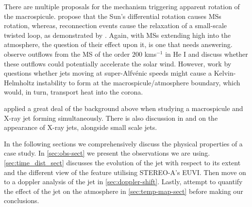 There are multiple proposals for the mechanism triggering apparent rotation of the macrospicule. 
\cite{Curdt2011} propose that the Sun's differential rotation causes MSs rotation, whereas, reconnection events cause the relaxation of a small-scale twisted loop, as demonstrated by \cite{Adams2014}.
Again, with MSs extending high into the atmosphere, the question of their effect upon it, is one that needs answering.
\cite{Pike1997} observe outflows from the MS of the order $200$ kms$^{-1}$ in He I and discuss whether these outflows could potentially accelerate the solar wind.
However, work by \cite{Zaqarashvili2014} questions whether jets moving at super-Alfv{\'e}nic speeds might cause a Kelvin-Helmholtz instability to form at the macrospicule/atmosphere boundary, which would, in turn, transport heat into the corona.

\cite{Kamio2010} applied a great deal of the background above when studying a macrospicule and X-ray jet forming simultaneously. 
There is also discussion in \cite{Pike1997} and \cite{Kim2007} on the appearance of X-ray jets, alongside small scale jets.

In the following sections we comprehensively discuss the physical properties of a case study. In \cref{sec:obs-sect} we present the observations we are using. 
\ref{sec:time_dist_sect} discusses the evolution of the jet with respect to its extent and the different view of the feature utilising STEREO-A's EUVI. 
Then move on to a doppler analysis of the jet in \cref{sec:doppler-shift}.
Lastly, attempt to quantify the effect of the jet on the atmosphere in \cref{sec:temp-map-sect} before making our conclusions.

